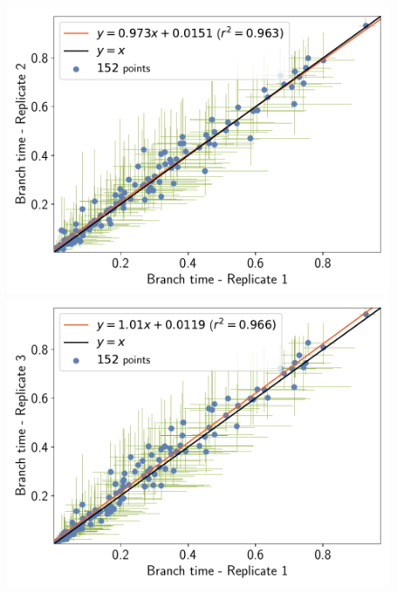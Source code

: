 \documentclass{article}
\begin{document}
	\begin{figure}[H]
		\centering
		\begin{minipage}{0.32\linewidth}
			\includegraphics[width=\linewidth, page=1]{mammals/18CDS_SiteMutSelBranchNe_Rep_BranchTime-1-2}
		\end{minipage} \hfill
		\begin{minipage}{0.32\linewidth}
			\includegraphics[width=\linewidth, page=1]{mammals/18CDS_SiteMutSelBranchNe_Rep_BranchTime-1-3}
		\end{minipage} \hfill
		\begin{minipage}{0.32\linewidth}

\end{minipage}
\end{figure}
\end{document}
